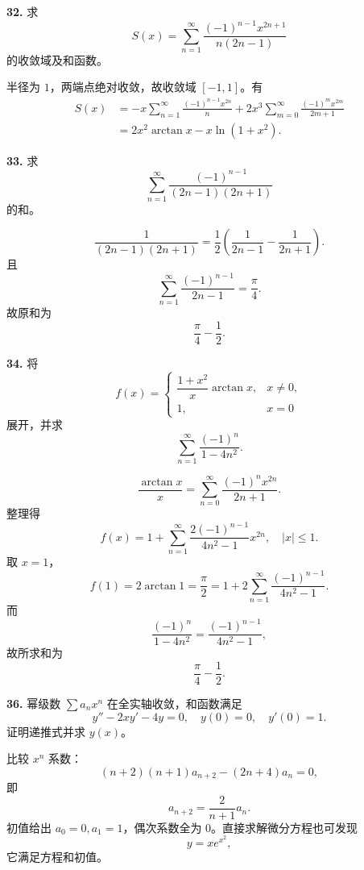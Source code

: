 \begin{problemblock}
\textbf{32.} 求
\[
S(x)=\sum_{n=1}^{\infty}\frac{(-1)^{n-1}x^{2n+1}}{n(2n-1)}
\]
的收敛域及和函数。
\end{problemblock}
\begin{solutionblock}
半径为 \(1\)，两端点绝对收敛，故收敛域 \([-1,1]\)。有
\[
\begin{aligned}
S(x)
&=-x\sum_{n=1}^{\infty}\frac{(-1)^{n-1}x^{2n}}n
+2x^3\sum_{m=0}^{\infty}\frac{(-1)^mx^{2m}}{2m+1}\\
&=\boxed{2x^2\arctan x-x\ln(1+x^2)}.
\end{aligned}
\]
\end{solutionblock}

\begin{problemblock}
\textbf{33.} 求
\[
\sum_{n=1}^{\infty}\frac{(-1)^{n-1}}{(2n-1)(2n+1)}
\]
的和。
\end{problemblock}
\begin{solutionblock}
\[
\frac1{(2n-1)(2n+1)}=\frac12\left(\frac1{2n-1}-\frac1{2n+1}\right).
\]
且
\[
\sum_{n=1}^{\infty}\frac{(-1)^{n-1}}{2n-1}=\frac{\pi}{4}.
\]
故原和为
\[
\boxed{\frac{\pi}{4}-\frac12}.
\]
\end{solutionblock}

\begin{problemblock}
\textbf{34.} 将
\[
f(x)=
\begin{cases}
\dfrac{1+x^2}{x}\arctan x,&x\ne0,\\
1,&x=0
\end{cases}
\]
展开，并求
\[
\sum_{n=1}^{\infty}\frac{(-1)^n}{1-4n^2}.
\]
\end{problemblock}
\begin{solutionblock}
\[
\frac{\arctan x}{x}=\sum_{n=0}^{\infty}\frac{(-1)^nx^{2n}}{2n+1}.
\]
整理得
\[
f(x)=1+\sum_{n=1}^{\infty}\frac{2(-1)^{n-1}}{4n^2-1}x^{2n},\quad |x|\le1.
\]
取 \(x=1\)，
\[
f(1)=2\arctan1=\frac{\pi}{2}
=1+2\sum_{n=1}^{\infty}\frac{(-1)^{n-1}}{4n^2-1}.
\]
而
\[
\frac{(-1)^n}{1-4n^2}=\frac{(-1)^{n-1}}{4n^2-1},
\]
故所求和为
\[
\boxed{\frac{\pi}{4}-\frac12}.
\]
\end{solutionblock}

\begin{problemblock}
\textbf{36.} 幂级数 \(\sum a_nx^n\) 在全实轴收敛，和函数满足
\[
y''-2xy'-4y=0,\quad y(0)=0,\quad y'(0)=1.
\]
证明递推式并求 \(y(x)\)。
\end{problemblock}
\begin{solutionblock}
比较 \(x^n\) 系数：
\[
(n+2)(n+1)a_{n+2}-(2n+4)a_n=0,
\]
即
\[
a_{n+2}=\frac{2}{n+1}a_n.
\]
初值给出 \(a_0=0,a_1=1\)，偶次系数全为 \(0\)。直接求解微分方程也可发现
\[
\boxed{y=xe^{x^2}},
\]
它满足方程和初值。
\end{solutionblock}

